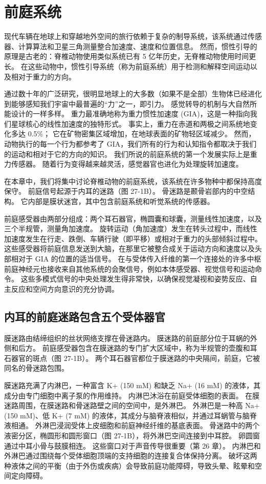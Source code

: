 \chapter{前庭系统}

现代车辆在地球上和穿越地外空间的旅行依赖于复杂的制导系统，该系统通过传感器、计算算法和卫星三角测量整合加速度、速度和位置信息。 然而，惯性引导的原理是古老的：脊椎动物使用类似系统已有 5 亿年历史，无脊椎动物使用时间更长。 在这些动物中，惯性引导系统（称为前庭系统）用于检测和解释空间运动以及相对于重力的方向。

通过数十年的广泛研究，很明显地球上的大多数（如果不是全部）生物体已经进化到能够感知我们宇宙中最普遍的“力”之一，即引力。 感觉转导的机制与大自然所能设计的一样多样。 重力最准确地称为重力惯性加速度 (GIA)，这是一种指向我们星球核心的线性加速度的独特形式。 事实上，重力在赤道和两极之间系统地变化多达 0.5\%； 它在矿物密集区域增加，在地球表面的矿物轻区域减少。 然而，动物执行的每一个行为都参考了 GIA，我们所有的行为和认知指令都取决于我们的运动和相对于它的方向的知识。 我们所说的前庭系统的第一个发展实际上是重力传感器。 随着行为变得越来越灵活，感觉器官也进化为处理旋转加速度。

在本章中，我们将集中讨论脊椎动物的前庭系统，该系统在许多物种中都保持高度保守。 前庭信号起源于内耳的迷路（图 27-1B）。 骨迷路是颞骨岩部内的中空结构。 它内部是膜状迷宫，其中包含前庭系统和听觉系统的传感器。

前庭感受器由两部分组成：两个耳石器官，椭圆囊和球囊，测量线性加速度，以及三个半规管，测量角加速度。 旋转运动（角加速度）发生在转头过程中，而线性加速度发生在行走、跌倒、车辆行驶（即平移）或相对于重力的头部倾斜过程中。 这些感受器将前庭信息发送到大脑，在那里它被整合成关于运动方向和速度以及头部相对于 GIA 的位置的适当信号。 在与受体传入纤维的第一个连接处的许多中枢前庭神经元也接收来自其他系统的会聚信号，例如本体感受器、视觉信号和运动命令。 这些多模式信号的中央处理发生得非常快，以确保视觉凝视和姿势反应、自主反应和空间方向意识的充分协调。

\section{内耳的前庭迷路包含五个受体器官}
膜迷路由结缔组织的丝状网络支撑在骨迷路内。 膜迷路的前庭部分位于耳蜗的外侧和后方。 前庭感受器包含在膜迷路的专门扩大区域中，称为半规管的壶腹和耳石器官的斑点（图 27-1B）。 两个耳石器官都位于膜迷路的中央隔间，前庭，它被同名的骨迷路包围。

膜迷路充满了内淋巴，一种富含 K+ (150 mM) 和缺乏 Na+ (16 mM) 的液体，其成分由专门细胞中离子泵的作用维持。 内淋巴沐浴在前庭受体细胞的表面。 在膜迷路周围，在膜迷路和骨迷路壁之间的空间中，是外淋巴。 外淋巴是一种高 Na+ (150 mM)、低 K+ (7 mM) 的液体，其成分与脑脊液相似，并通过耳蜗管与脑脊液相通。 外淋巴浸润受体上皮细胞和前庭神经纤维的基底表面。 骨迷路中的两个液密分区，椭圆形和圆形窗口（图 27-1B），将外淋巴空间连接到中耳腔。 卵圆窗通过中耳小骨与鼓膜相连。 这些窗口对于声音传导很重要（第 26 章）。 内淋巴和外淋巴通过围绕每个受体细胞顶端的支持细胞的连接复合体保持分离。 破坏这两种液体之间的平衡（由于外伤或疾病）会导致前庭功能障碍，导致头晕、眩晕和空间定向障碍。

